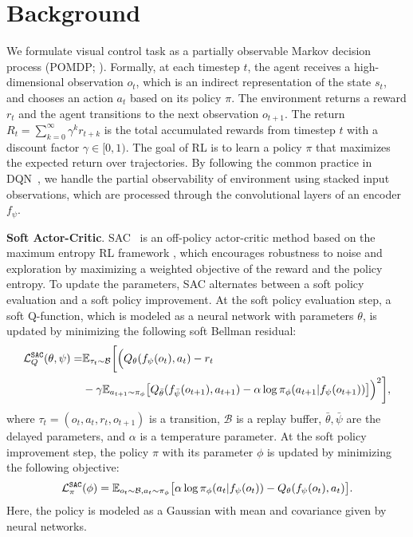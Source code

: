 \documentclass{article}
\begin{document}
\section{Background} \label{sec:background}
We formulate visual control task as a partially observable Markov decision process (POMDP; \citealt{sutton2018reinforcement, kaelbling1998planning}).
Formally, at each timestep $t$, the agent receives a high-dimensional observation $o_t$, which is an indirect representation of the state $s_t$, and chooses an action $a_t$ based on its policy $\pi$.
The environment returns a reward $r_t$ and the agent transitions to the next observation $o_{t+1}$.
The return $R_t = \sum_{k=0}^\infty \gamma^k r_{t+k}$ is the total accumulated rewards from timestep $t$ with a discount factor $\gamma \in [0,1)$.
The goal of RL is to learn a policy $\pi$ that maximizes the expected return over trajectories.
By following the common practice in DQN~\citep{mnih2015human}, we handle the partial observability of environment using stacked input observations, which are processed through the convolutional layers of an encoder $f_{\psi}$.

{\bf Soft Actor-Critic}. SAC~\citep{haarnoja2018soft} is an off-policy actor-critic method based on the maximum entropy RL framework \citep{ziebart2010modeling}, which encourages robustness to noise and exploration by maximizing a weighted objective of the reward and the policy entropy.
To update the parameters, SAC alternates between a soft policy evaluation and a soft policy improvement.
At the soft policy evaluation step,
a soft Q-function, which is modeled as a neural network with parameters $\theta$, is updated by minimizing the following soft Bellman residual:
\begin{align*}
  \mathcal{L}^{\tt SAC}_Q (\theta,\psi) = &\mathbb{E}_{\tau_t \sim \mathcal{B}}\bigg[ \Big(Q_\theta(f_\psi(o_t),a_t) - r_t \\
  &- \gamma \mathbb{E}_{a_{t+1}\sim \pi_\phi} \big[ Q_{\bar \theta} (f_{\bar\psi}(o_{t+1}),a_{t+1})
  - \alpha \log \pi_{\phi} (a_{t+1}|f_\psi(o_{t+1})) \big]\Big)^2\bigg], 
\end{align*} \label{eq:sac_critic_tot} 
where $\tau_t = (o_t,a_t,r_t,o_{t+1})$ is a transition,
$\mathcal{B}$ is a replay buffer,
$\bar \theta, \bar \psi$ are the delayed parameters,
and $\alpha$ is a temperature parameter.
At the soft policy improvement step,
the policy $\pi$ with its parameter $\phi$ is updated by minimizing the following objective:
\begin{align*} 
  \mathcal{L}^{\tt SAC}_\pi(\phi) = \mathbb{E}_{o_t\sim \mathcal{B}, a_{t}\sim \pi_\phi} \big[  \alpha \log \pi_\phi (a_t|f_\psi(o_t))
  - Q_{ \theta} (f_\psi(o_{t}),a_{t}) \big].
\end{align*}
Here, the policy is modeled as a Gaussian with mean and covariance given by neural networks.
\end{document}
